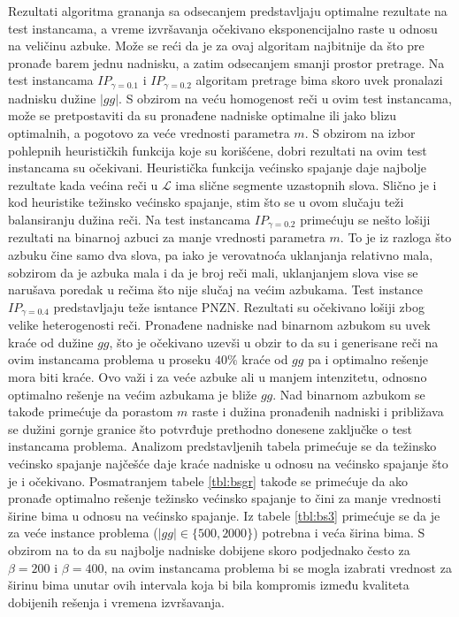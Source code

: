 \documentclass[12pt,oneside]{memoir}
\begin{document}
Rezultati algoritma grananja sa odsecanjem predstavljaju optimalne rezultate
na test instancama, a vreme izvršavanja očekivano eksponencijalno raste u odnosu na
veličinu azbuke. Može se reći da je za ovaj algoritam najbitnije da što pre pronađe barem jednu
nadnisku, a zatim odsecanjem smanji prostor pretrage.
Na test instancama $IP_{\gamma=0.1}$ i $IP_{\gamma=0.2}$ algoritam pretrage bima
skoro uvek pronalazi nadnisku dužine $|gg|$. S obzirom na veću homogenost reči
u ovim test instancama, može se pretpostaviti da su pronađene nadniske
optimalne ili jako blizu optimalnih, a pogotovo za veće vrednosti parametra $m$.
S obzirom na izbor pohlepnih heurističkih funkcija koje su korišćene,
dobri rezultati na ovim test instancama su očekivani.
Heuristička funkcija većinsko spajanje daje najbolje rezultate
kada većina reči u $\mathcal{L}$ ima slične segmente uzastopnih slova.
Slično je i kod heuristike težinsko većinsko spajanje, stim što se u ovom
slučaju teži balansiranju dužina reči.
Na test instancama $IP_{\gamma=0.2}$ primećuju se nešto lošiji rezultati
na binarnoj azbuci za manje vrednosti parametra $m$. To je iz razloga
što azbuku čine samo dva slova, pa iako je verovatnoća uklanjanja relativno mala,
sobzirom da je azbuka mala i da je broj reči mali, uklanjanjem
slova vise se narušava poredak u rečima što nije slučaj na većim azbukama.
Test instance $IP_{\gamma=0.4}$ predstavljaju teže isntance PNZN.
Rezultati su očekivano lošiji zbog velike heterogenosti reči. Pronađene nadniske nad binarnom azbukom
su uvek kraće od dužine $gg$, što je očekivano uzevši u obzir to da su i generisane
reči na ovim instancama problema u proseku $40\%$ kraće od $gg$ pa i optimalno rešenje
mora biti kraće. Ovo važi i za veće azbuke ali u manjem intenzitetu,
odnosno optimalno rešenje na većim azbukama je bliže $gg$.
Nad binarnom azbukom se takođe primećuje da porastom $m$ raste i dužina pronađenih nadniski
i približava se dužini gornje granice što potvrđuje prethodno donesene zaključke
o test instancama problema.
Analizom predstavljenih tabela primećuje se da težinsko većinsko spajanje
najčešće daje kraće nadniske u odnosu na većinsko spajanje što je i očekivano.
Posmatranjem tabele \ref{tbl:bsgr} takođe se primećuje da ako pronađe optimalno rešenje
težinsko većinsko spajanje to čini za manje vrednosti širine bima u odnosu na
većinsko spajanje. Iz tabele \ref{tbl:bs3} primećuje se da je za veće instance problema
($|gg| \in \{500,2000\}$) potrebna i veća širina bima. S obzirom na to da su najbolje
nadniske dobijene skoro podjednako često za $\beta=200$ i $\beta=400$, na ovim instancama problema
bi se mogla izabrati vrednost za širinu bima unutar ovih intervala koja bi bila kompromis između
kvaliteta dobijenih rešenja i vremena izvršavanja.
\end{document}
